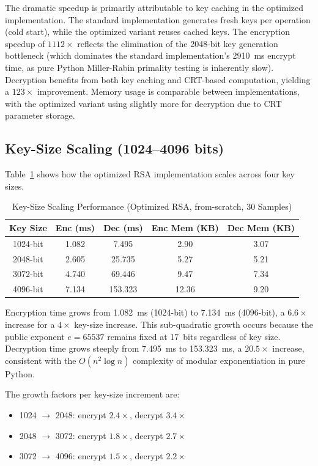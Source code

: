 \documentclass[journal]{IEEEtran}
\begin{document}
The dramatic speedup is primarily attributable to key caching in the optimized implementation. The standard implementation generates fresh keys per operation (cold start), while the optimized variant reuses cached keys. The encryption speedup of $1112\times$ reflects the elimination of the 2048-bit key generation bottleneck (which dominates the standard implementation's 2910~ms encrypt time, as pure Python Miller-Rabin primality testing is inherently slow). Decryption benefits from both key caching and CRT-based computation, yielding a $123\times$ improvement. Memory usage is comparable between implementations, with the optimized variant using slightly more for decryption due to CRT parameter storage.

\subsection{Key-Size Scaling (1024--4096 bits)}

Table~\ref{tab:keysize} shows how the optimized RSA implementation scales across four key sizes.

\begin{table}[H]
\caption{Key-Size Scaling Performance (Optimized RSA, from-scratch, 30 Samples)}
\label{tab:keysize}
\centering
\begin{tabular}{|c|c|c|c|c|}
\hline
\textbf{Key Size} & \textbf{Enc (ms)} & \textbf{Dec (ms)} & \textbf{Enc Mem (KB)} & \textbf{Dec Mem (KB)} \\
\hline
1024-bit & 1.082 & 7.495 & 2.90 & 3.07 \\
\hline
2048-bit & 2.605 & 25.735 & 5.27 & 5.21 \\
\hline
3072-bit & 4.740 & 69.446 & 9.47 & 7.34 \\
\hline
4096-bit & 7.134 & 153.323 & 12.36 & 9.20 \\
\hline
\end{tabular}
\end{table}

Encryption time grows from 1.082~ms (1024-bit) to 7.134~ms (4096-bit), a $6.6\times$ increase for a $4\times$ key-size increase. This sub-quadratic growth occurs because the public exponent $e = 65537$ remains fixed at 17~bits regardless of key size. Decryption time grows steeply from 7.495~ms to 153.323~ms, a $20.5\times$ increase, consistent with the $O(n^2 \log n)$ complexity of modular exponentiation in pure Python.

The growth factors per key-size increment are:
\begin{itemize}
    \item 1024 $\rightarrow$ 2048: encrypt $2.4\times$, decrypt $3.4\times$
    \item 2048 $\rightarrow$ 3072: encrypt $1.8\times$, decrypt $2.7\times$
    \item 3072 $\rightarrow$ 4096: encrypt $1.5\times$, decrypt $2.2\times$
\end{itemize}
\end{document}
